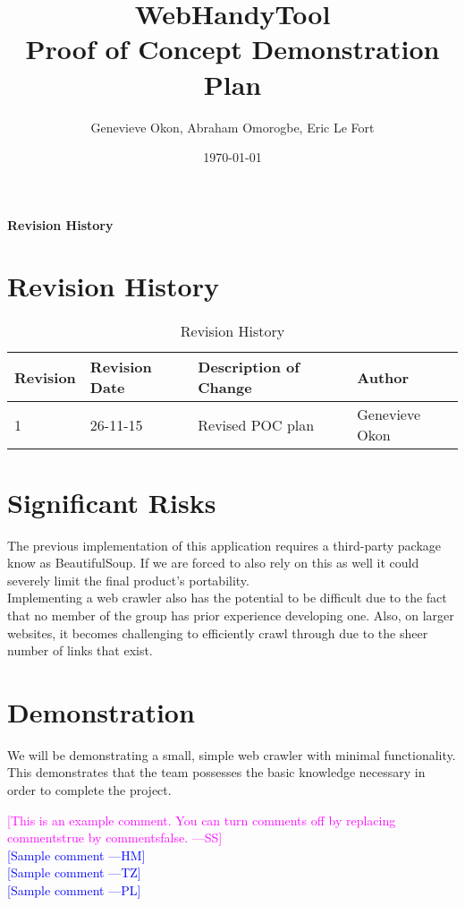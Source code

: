 \documentclass[12pt]{article}
\newcommand{\authornote}[3]{\textcolor{#1}{[#3 ---#2]}}
\newcommand{\authornote}[3]{}
\newcommand{\wss}[1]{\authornote{magenta}{SS}{#1}}
\newcommand{\hm}[1]{\authornote{blue}{HM}{#1}} %
\newcommand{\tz}[1]{\authornote{blue}{TZ}{#1}} %
\newcommand{\pl}[1]{\authornote{blue}{PL}{#1}} %
\begin{document}
\title{WebHandyTool \\
 Proof of Concept Demonstration Plan }
\author{Genevieve Okon, Abraham Omorogbe, Eric Le Fort}
\date{\today}
\pagebreak
\maketitle


\tableofcontents

\listoftables

\textbf{Revision History} \\ \normalsize
\pagebreak

\section{Revision History}
\begin{table}[h!]
	\begin{tabular}{| p{5cm} | p{5cm} | p{5cm} |p{5cm} |}    \hline
Revision  &Revision Date &Description of Change &Author\\ \hline
1& 26-11-15&Revised POC plan&Genevieve Okon\\ \hline

       \end{tabular}
       
       \caption{Revision History}
       \label{table:Revision History}
\end{table}



\section{Significant Risks}
The previous implementation of this application requires a third-party package know as BeautifulSoup. If we are forced to also rely on this as well it could severely limit the final product's portability.\\

Implementing a web crawler also has the potential to be difficult due to the fact that no member of the group has prior experience developing one. Also, on larger websites, it becomes challenging to efficiently crawl through due to the sheer number of links that exist.\\

\section{Demonstration}
We will be demonstrating a small, simple web crawler with minimal functionality. This demonstrates that the team possesses the basic knowledge necessary in order to complete the project.

\noindent \wss{This is an example comment.  You can turn comments off by replacing
  commentstrue by commentsfalse.}\\
\hm{Sample comment}\\
\tz{Sample comment}\\
\pl{Sample comment}
\end{document}
